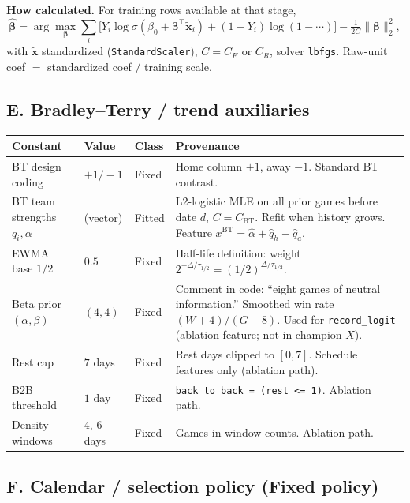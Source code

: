 \documentclass[10pt]{article}
\newcommand{\cls}[1]{\textbf{#1}}
\newcommand{\code}[1]{\texttt{#1}}
\begin{document}
\noindent\textbf{How calculated.} For training rows available at that stage,
\[
\hat{\boldsymbol{\beta}}
=
\arg\max_{\boldsymbol{\beta}}
\sum_i
\big[
Y_i\log\sigma(\beta_0+\boldsymbol{\beta}^\top\tilde{\mathbf{x}}_i)
+(1-Y_i)\log(1-\cdots)
\big]
-\tfrac{1}{2C}\|\boldsymbol{\beta}\|_2^2,
\]
with \(\tilde{\mathbf{x}}\) standardized (\code{StandardScaler}),
\(C=C_E\) or \(C_R\), solver \code{lbfgs}.
Raw-unit coef \(=\) standardized coef \(/\) training scale.

\subsection{E. Bradley--Terry / trend auxiliaries}

\begin{longtable}{@{}>{\raggedright\arraybackslash}p{1.35in}
>{\raggedright\arraybackslash}p{0.7in}
>{\raggedright\arraybackslash}p{0.72in}
>{\raggedright\arraybackslash}p{3.35in}@{}}
\toprule
\textbf{Constant} & \textbf{Value} & \textbf{Class} & \textbf{Provenance} \\
\midrule
\endhead
BT design coding & \(+1/-1\) & Fixed & Home column \(+1\), away \(-1\). Standard BT contrast. \\
BT team strengths \(q_i,\alpha\) & (vector) & Fitted & L2-logistic MLE on all prior games before date \(d\), \(C=C_{\mathrm{BT}}\). Refit when history grows. Feature \(x^{\mathrm{BT}}=\hat\alpha+\hat q_h-\hat q_a\). \\
EWMA base \(1/2\) & \(0.5\) & Fixed & Half-life definition: weight \(2^{-\Delta/\tau_{1/2}}=(1/2)^{\Delta/\tau_{1/2}}\). \\
Beta prior \((\alpha,\beta)\) & \((4,4)\) & Fixed & Comment in code: ``eight games of neutral information.'' Smoothed win rate \((W+4)/(G+8)\). Used for \code{record\_logit} (ablation feature; not in champion \(X\)). \\
Rest cap & \(7\) days & Fixed & Rest days clipped to \([0,7]\). Schedule features only (ablation path). \\
B2B threshold & \(1\) day & Fixed & \code{back\_to\_back = (rest <= 1)}. Ablation path. \\
Density windows & \(4\), \(6\) days & Fixed & Games-in-window counts. Ablation path. \\
\bottomrule
\end{longtable}

\subsection{F. Calendar / selection policy (\cls{Fixed} policy)}
\end{document}
